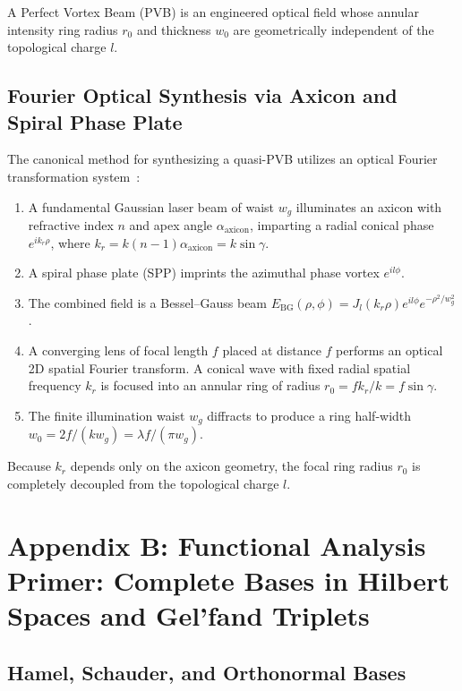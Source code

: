 \documentclass[11pt,a4paper]{article}
\begin{document}
A Perfect Vortex Beam (PVB) is an engineered optical field whose annular intensity ring radius $r_0$ and thickness $w_0$ are geometrically independent of the topological charge $l$.

\subsection{Fourier Optical Synthesis via Axicon and Spiral Phase Plate}

The canonical method for synthesizing a quasi-PVB utilizes an optical Fourier transformation system~\cite{Vaity2015}:
\begin{enumerate}
    \item A fundamental Gaussian laser beam of waist $w_g$ illuminates an axicon with refractive index $n$ and apex angle $\alpha_{\text{axicon}}$, imparting a radial conical phase $e^{i k_r \rho}$, where $k_r = k (n-1) \alpha_{\text{axicon}} = k \sin \gamma$.
    \item A spiral phase plate (SPP) imprints the azimuthal phase vortex $e^{i l \phi}$.
    \item The combined field is a Bessel--Gauss beam $E_{\text{BG}}(\rho, \phi) = J_l(k_r \rho) e^{i l \phi} e^{-\rho^2 / w_g^2}$.
    \item A converging lens of focal length $f$ placed at distance $f$ performs an optical 2D spatial Fourier transform. A conical wave with fixed radial spatial frequency $k_r$ is focused into an annular ring of radius $r_0 = f k_r / k = f \sin \gamma$.
    \item The finite illumination waist $w_g$ diffracts to produce a ring half-width $w_0 = 2f / (k w_g) = \lambda f / (\pi w_g)$.
\end{enumerate}

Because $k_r$ depends only on the axicon geometry, the focal ring radius $r_0$ is completely decoupled from the topological charge $l$.

\section{Appendix B: Functional Analysis Primer: Complete Bases in Hilbert Spaces and Gel'fand Triplets}
\label{app:hilbert}

\subsection{Hamel, Schauder, and Orthonormal Bases}
\end{document}
